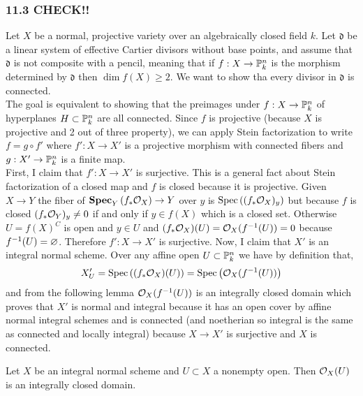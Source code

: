 \documentclass[12pt]{article}
\begin{document}
\subsubsection{11.3 CHECK!!}

Let $X$ be a normal, projective variety over an algebraically closed field $k$. Let $\mathfrak{d}$ be a linear system of effective Cartier divisors without base points, and assume that $\mathfrak{d}$ is not composite with a pencil, meaning that if $f : X \to \P^n_k$ is the morphism determined by $\mathfrak{d}$ then $\dim{f(X)} \ge 2$. We want to show tha every divisor in $\mathfrak{d}$ is connected.
\bigskip\\
The goal is equivalent to showing that the preimages under  $f : X \to \P^n_k$ of hyperplanes $H \subset \P^n_k$ are all connected. Since $f$ is projective (because $X$ is projective and 2 out of three property), we can apply Stein factorization to write $f = g \circ f'$ where $f' : X \to X'$ is a projective morphism with connected fibers and $g : X' \to \P^n_k$ is a finite map. 
\bigskip\\
First, I claim that $f' : X \to X'$ is surjective. This is a general fact about Stein factorization of a closed map and $f$ is closed because it is projective. Given $X \to Y$ the fiber of $\rSpec{Y}{f_* \struct{X}} \to Y$ over $y$ is $\Spec{(f_* \struct{X})_y}$ but because $f$ is closed $(f_* \struct{Y})_y \neq 0$ if and only if $y \in f(X)$ which is a closed set. Otherwise $U = f(X)^C$ is open and $y \in U$ and $(f_* \struct{X})(U) = \struct{X}(f^{-1}(U)) = 0$ because $f^{-1}(U) = \empty$. Therefore $f' : X \to X'$ is surjective. Now, I claim that $X'$ is an integral normal scheme. Over any affine open $U \subset \P^n_k$ we have by definition that, 
\[ X'_U = \Spec{(f_* \struct{X})(U)} = \Spec{\struct{X}(f^{-1}(U))} \]
and from the following lemma $\struct{X}(f^{-1}(U))$ is an integrally closed domain which proves that $X'$ is normal and integral because it has an open cover by affine normal integral schemes and is connected (and noetherian so integral is the same as connected and locally integral) because $X \to X'$ is surjective and $X$ is connected. 

\begin{lemma}
Let $X$ be an integral normal scheme and $U \subset X$ a nonempty open. Then $\struct{X}(U)$ is an integrally closed domain.
\end{lemma}
\end{document}
